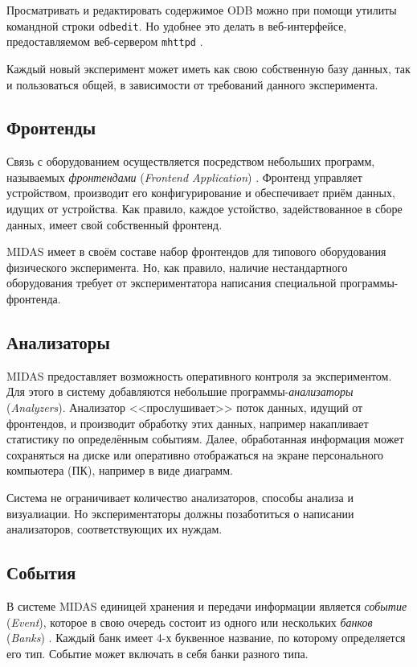 \documentclass[12pt, a4paper, oneside, onecolumn]{book}
\newcommand{\MIDAS}{\mbox{MIDAS}}
\newcommand{\APP}[1]{\mbox{\tt #1}}
\newcommand{\TERM}[1]{{\it #1}}
\begin{document}
Просматривать и редактировать содержимое ODB можно при помощи утилиты командной строки \APP{odbedit}. Но удобнее это делать в веб-интерфейсе, предоставляемом веб-сервером \APP{mhttpd} \cite{MidasWikiMhttpd}.

Каждый новый эксперимент может иметь как свою собственную базу данных, так и пользоваться общей, в зависимости от требований данного эксперимента.

\subsection{Фронтенды}
\label{sec-midas-frontend}

Связь с оборудованием осуществляется посредством небольших программ, называемых \TERM{фронтендами} (\TERM{Frontend Application}) \cite{MidasWikiFrontend}. Фронтенд управляет устройством, производит его конфигурирование и обеспечивает приём данных, идущих от устройства. Как правило, каждое устойство, задействованное в сборе данных, имеет свой собственный фронтенд.

\MIDAS{} имеет в своём составе набор фронтендов для типового оборудования физического эксперимента. Но, как правило, наличие нестандартного оборудования требует от экспериментатора написания специальной программы-фронтенда.

\subsection{Анализаторы}
\label{sec-midas-analyzer}

\MIDAS{} предоставляет возможность оперативного контроля за экспериментом. Для этого в систему добавляются небольшие программы-\TERM{анализаторы} (\TERM{Analyzers}). Анализатор <<прослушивает>> поток данных, идущий от фронтендов, и производит обработку этих данных, например накапливает статистику по определённым событиям. Далее, обработанная информация может сохраняться на диске или оперативно отображаться на экране персонального компьютера (ПК), например в виде диаграмм.

Система не ограничивает количество анализаторов, способы анализа и визуалиации. Но экспериментаторы должны позаботиться о написании анализаторов, соответствующих их нуждам.

\subsection{События}
\label{sec-midas-event}

В системе \MIDAS{} единицей хранения и передачи информации является \TERM{событие} (\TERM{Event}), которое в свою очередь состоит из одного или нескольких \TERM{банков} (\TERM{Banks}) \cite{MidasWikiEvent}. Каждый банк имеет 4-х буквенное название, по которому определяется его тип. Событие может включать в себя банки разного типа.
\end{document}
